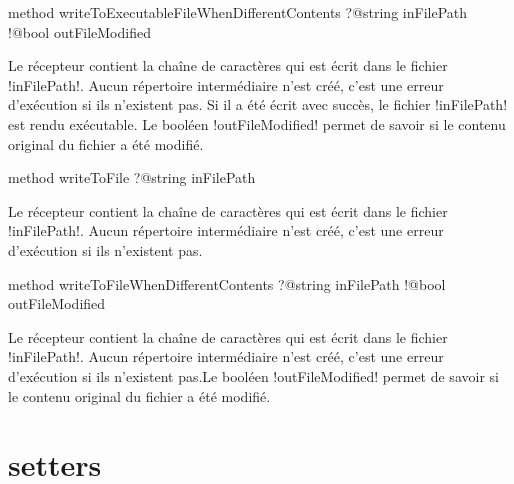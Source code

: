 
\begin{galgasbox}
method writeToExecutableFileWhenDifferentContents
    ?@string inFilePath
    !@bool outFileModified
\end{galgasbox}

Le récepteur contient la chaîne de caractères qui est écrit dans le fichier \ggs!inFilePath!. Aucun répertoire intermédiaire n'est créé, c'est une erreur d'exécution si ils n'existent pas. Si il a été écrit avec succès, le fichier \ggs!inFilePath! est rendu exécutable. Le booléen \ggs!outFileModified! permet de savoir si le contenu original du fichier a été modifié.










\begin{galgasbox}
method writeToFile ?@string inFilePath
\end{galgasbox}

Le récepteur contient la chaîne de caractères qui est écrit dans le fichier \ggs!inFilePath!. Aucun répertoire intermédiaire n'est créé, c'est une erreur d'exécution si ils n'existent pas.










\begin{galgasbox}
method writeToFileWhenDifferentContents
    ?@string inFilePath
    !@bool outFileModified
\end{galgasbox}

Le récepteur contient la chaîne de caractères qui est écrit dans le fichier \ggs!inFilePath!. Aucun répertoire intermédiaire n'est créé, c'est une erreur d'exécution si ils n'existent pas.Le booléen \ggs!outFileModified! permet de savoir si le contenu original du fichier a été modifié.















\section{setters}

